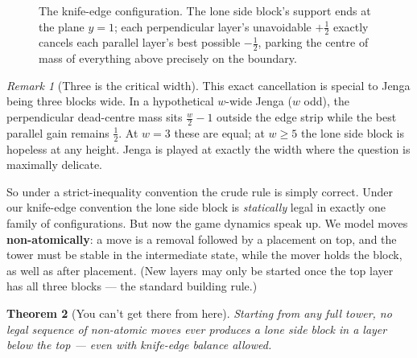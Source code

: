 \documentclass[11pt]{article}
\newtheorem{theorem}{Theorem}
\theoremstyle{definition}
\theoremstyle{remark}
\newtheorem{remark}[theorem]{Remark}
\newcommand{\layer}[1]{\texttt{#1}}
\begin{document}
\begin{figure}[ht]
\caption{The knife-edge configuration. The lone side block's support ends
at the plane $y=1$; each perpendicular layer's unavoidable $+\tfrac12$
exactly cancels each parallel layer's best possible $-\tfrac12$, parking
the centre of mass of everything above precisely on the boundary.}
\label{fig:knife}
\end{figure}

\begin{remark}[Three is the critical width]\label{rem:critical}
This exact cancellation is special to Jenga being three blocks wide. In a
hypothetical $w$-wide Jenga ($w$ odd), the perpendicular dead-centre mass
sits $\tfrac{w}{2}-1$ outside the edge strip while the best parallel gain
remains $\tfrac12$. At $w=3$ these are equal; at $w \ge 5$ the lone side
block is hopeless at any height. Jenga is played at exactly the width where
the question is maximally delicate.
\end{remark}

So under a strict-inequality convention the crude rule is simply correct.
Under our knife-edge convention the lone side block is \emph{statically}
legal in exactly one family of configurations. But now the game dynamics
speak up. We model moves \textbf{non-atomically}: a move is a removal
followed by a placement on top, and the tower must be stable in the
intermediate state, while the mover holds the block, as well as after
placement. (New layers may only be started once the top layer has all three
blocks --- the standard building rule.)

\begin{theorem}[You can't get there from here]\label{thm:unreachable}
Starting from any full tower, no legal sequence of non-atomic moves ever
produces a lone side block in a layer below the top --- even with
knife-edge balance allowed.
\end{theorem}
\end{document}
